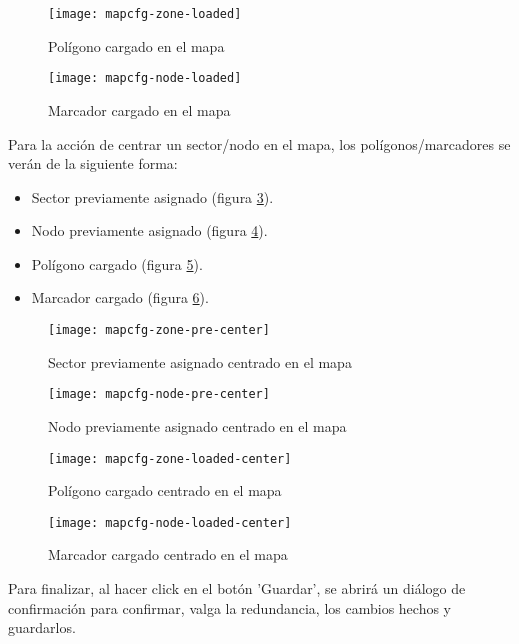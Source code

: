 \begin{figure}[H]
	\centering
	\texttt{[image: mapcfg-zone-loaded]}
	\caption{\label{fig:mapcfg-zone-loaded} Polígono cargado en el mapa}
\end{figure}

\begin{figure}[H]
	\centering
	\texttt{[image: mapcfg-node-loaded]}
	\caption{\label{fig:mapcfg-node-loaded} Marcador cargado en el mapa}
\end{figure}

Para la acción de centrar un sector/nodo en el mapa, los polígonos/marcadores se verán de la siguiente forma:
\begin{itemize}
    \item Sector previamente asignado (figura \ref{fig:mapcfg-zone-pre-center}).
    \item Nodo previamente asignado (figura \ref{fig:mapcfg-node-pre-center}).
    \item Polígono cargado (figura \ref{fig:mapcfg-zone-loaded-center}).
    \item Marcador cargado (figura \ref{fig:mapcfg-node-loaded-center}).
\end{itemize}

\begin{figure}[H]
	\centering
	\texttt{[image: mapcfg-zone-pre-center]}
	\caption{\label{fig:mapcfg-zone-pre-center} Sector previamente asignado centrado en el mapa}
\end{figure}

\begin{figure}[H]
	\centering
	\texttt{[image: mapcfg-node-pre-center]}
	\caption{\label{fig:mapcfg-node-pre-center} Nodo previamente asignado centrado en el mapa}
\end{figure}

\begin{figure}[H]
	\centering
	\texttt{[image: mapcfg-zone-loaded-center]}
	\caption{\label{fig:mapcfg-zone-loaded-center} Polígono cargado centrado en el mapa}
\end{figure}

\begin{figure}[H]
	\centering
	\texttt{[image: mapcfg-node-loaded-center]}
	\caption{\label{fig:mapcfg-node-loaded-center} Marcador cargado centrado en el mapa}
\end{figure}

Para finalizar, al hacer click en el botón 'Guardar', se abrirá un diálogo de confirmación para confirmar, valga la redundancia, los cambios hechos y guardarlos.

